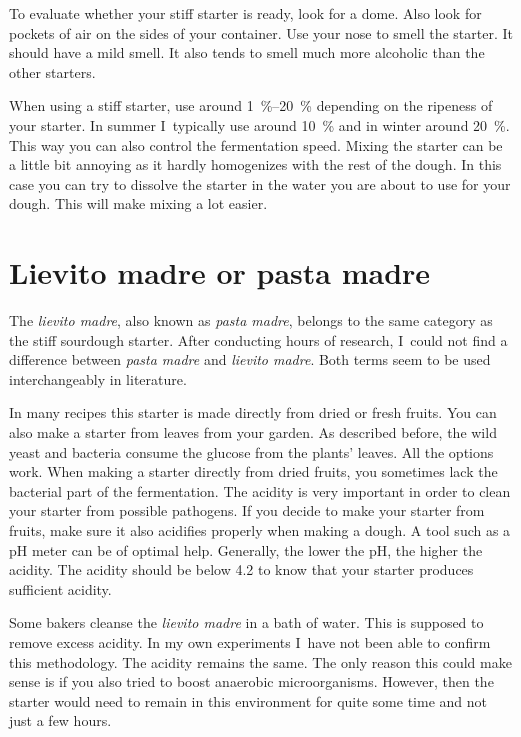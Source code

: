 To evaluate whether your stiff starter is ready, look for a dome. Also look for
pockets of air on the sides of your container. Use your nose to smell the
starter. It should have a mild smell. It also tends to smell much more
alcoholic than the other starters.

When using a stiff starter, use around \qtyrange{1}{20}{\percent} depending on
the ripeness of your starter. In summer I~typically use around
\qty{10}{\percent} and in winter around \qty{20}{\percent}. This way you can
also control the fermentation speed.
Mixing the starter can be a little bit annoying as it hardly homogenizes with
the rest of the dough. In this case you can try to dissolve the starter in the
water you are about to use for your dough. This will make mixing a lot easier.


\section{Lievito madre or pasta madre}

The \emph{lievito madre}, also known as \emph{pasta madre}, belongs to the
same category as the stiff sourdough starter. After conducting hours of
research, I~could not find a difference between \emph{pasta madre} and
\emph{lievito madre}. Both terms seem to be used interchangeably in
literature.

In many recipes this starter is made directly
from dried or fresh fruits. You can also make a starter from leaves from your
garden. As described before, the wild yeast and bacteria consume the glucose
from the plants' leaves. All the options work. When making a starter directly
from dried fruits, you sometimes lack the bacterial part of the fermentation.
The acidity is very important in order to clean your starter from possible
pathogens. If you decide to make your starter from fruits, make sure it also
acidifies properly when making a dough. A tool such as a pH meter can be of
optimal help. Generally, the lower the pH, the higher the acidity. The acidity
should be below 4.2 to know that your starter produces sufficient acidity.

Some bakers cleanse the \emph{lievito madre} in a bath of water. This is supposed to
remove excess acidity. In my own experiments I~have not been able to confirm
this methodology. The acidity remains the same. The only reason this could
make sense is if you also tried to boost anaerobic microorganisms. However, then the
starter would need to remain in this environment for quite some time and not just
a few hours.

